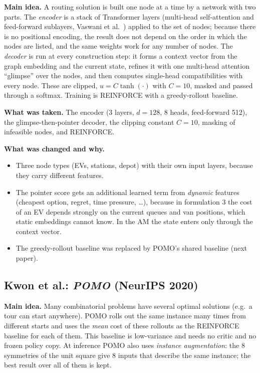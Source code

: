 \textbf{Main idea.} A routing solution is built one node at a time by a network with two parts. The \emph{encoder} is a stack of Transformer layers (multi-head self-attention and feed-forward sublayers, Vaswani et al.\ \cite{vaswani2017}) applied to the set of nodes; because there is no positional encoding, the result does not depend on the order in which the nodes are listed, and the same weights work for any number of nodes. The \emph{decoder} is run at every construction step: it forms a context vector from the graph embedding and the current state, refines it with one multi-head attention ``glimpse'' over the nodes, and then computes single-head compatibilities with every node. These are clipped, $u=C\tanh(\cdot)$ with $C=10$, masked and passed through a softmax. Training is REINFORCE with a greedy-rollout baseline.

\textbf{What was taken.} The encoder (3 layers, $d=128$, 8 heads, feed-forward 512), the glimpse-then-pointer decoder, the clipping constant $C=10$, masking of infeasible nodes, and REINFORCE.

\textbf{What was changed and why.}
\begin{itemize}
  \item Three node types (EVs, stations, depot) with their own input layers, because they carry different features.
  \item The pointer score gets an additional learned term from \emph{dynamic} features (cheapest option, regret, time pressure, \dots), because in formulation 3 the cost of an EV depends strongly on the current queues and van positions, which static embeddings cannot know. In the AM the state enters only through the context vector.
  \item The greedy-rollout baseline was replaced by POMO's shared baseline (next paper).
\end{itemize}

\subsection{Kwon et al.: \emph{POMO} (NeurIPS 2020)}

\textbf{Main idea.} Many combinatorial problems have several optimal solutions (e.g.\ a tour can start anywhere). POMO rolls out the same instance many times from different starts and uses the \emph{mean} cost of these rollouts as the REINFORCE baseline for each of them. This baseline is low-variance and needs no critic and no frozen policy copy. At inference POMO also uses \emph{instance augmentation}: the 8 symmetries of the unit square give 8 inputs that describe the same instance; the best result over all of them is kept.

